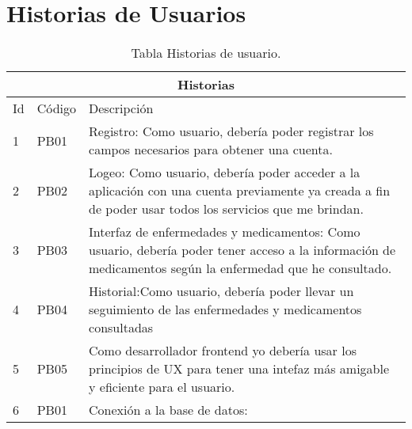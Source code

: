 \chapter{Historias de Usuarios}


\begin{table}[htb]
	\centering
	\begin{tabular}{|l|p{1.5cm}|p{10cm}|}
		\hline
		\multicolumn{3}{|c|}{Historias} \\ \hline
		Id & Código & Descripción \\
		\hline \hline
		1 & PB01  & Registro: Como usuario, debería poder registrar los campos necesarios para obtener una cuenta.\\ \hline
		
		2 & PB02  & Logeo: Como usuario, debería poder acceder a la aplicación con una cuenta previamente ya creada a fin de poder usar todos los servicios que me brindan.  \\ \hline
		
		3 & PB03 & Interfaz de enfermedades y medicamentos: 
		Como usuario, debería poder tener acceso a la información de medicamentos según la enfermedad que he consultado.   \\ \hline
		
		4 & PB04  & Historial:Como usuario, debería poder llevar un seguimiento de las enfermedades y medicamentos consultadas \\ \hline
		
		5 & PB05  & Como desarrollador frontend yo debería usar los 
		principios de UX para tener una intefaz más amigable 
		y eficiente para el usuario. 
		 \\ \hline
		
		6 & PB01  &  Conexión a la base de datos:  \\ \hline
	\end{tabular}
	\caption{Tabla Historias de usuario.}
	\label{tabla:Historial}
\end{table}